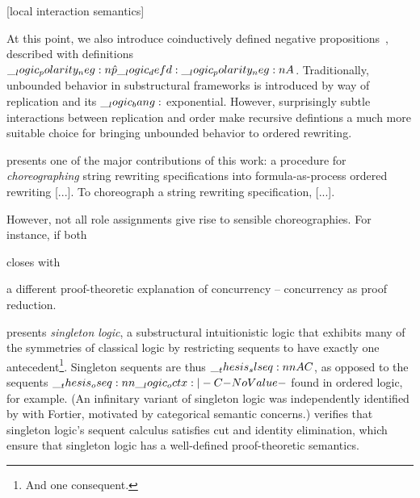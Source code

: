 [local interaction semantics]

At this point, we also introduce coinductively defined negative propositions~, described with definitions $\__logic_polarity_neg:n {\hat{p}} \__logic_defd: \__logic_polarity_neg:n {A}$.
Traditionally, unbounded behavior in substructural frameworks is introduced by way of replication and its $\__logic_bang:$ exponential.
However, surprisingly subtle interactions between replication and order make recursive defintions a much more suitable choice for bringing unbounded behavior to ordered rewriting.




 presents one of the major contributions of this work: a procedure for \emph{choreographing} string rewriting specifications into formula-as-process ordered rewriting [...].
To choreograph a string rewriting specification, [...].

However, not all role assignments give rise to sensible choreographies.
For instance, if both


 closes with


 a different proof-theoretic explanation of concurrency -- concurrency as proof reduction.

 presents \emph{singleton logic}, a substructural intuitionistic logic that exhibits many of the symmetries of classical logic by restricting sequents to have exactly one antecedent\footnote{And one consequent.}.
Singleton sequents are thus $\slseq{A |- C}$, as opposed to the sequents $\oseq{\octx |- C}$ found in ordered logic, for example.
(An infinitary variant of singleton logic was independently identified by \citeauthor{Santocanale:FOSSACS02} with Fortier\autocites{Santocanale:FOSSACS02}{Fortier+Santocanale:CSL13}, motivated by categorical semantic concerns.)
 verifies that singleton logic's sequent calculus satisfies cut and identity elimination, which ensure that singleton logic has a well-defined proof-theoretic semantics.

